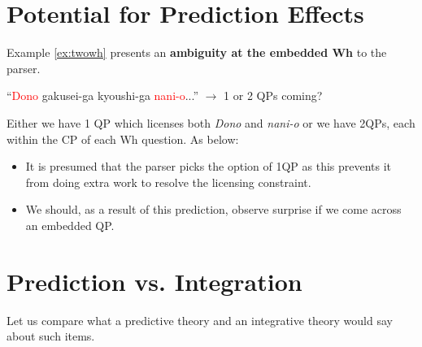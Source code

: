 \documentclass[12pt]{article}
\begin{document}
\section{Potential for Prediction Effects}
Example \ref{ex:twowh} presents an \textbf{ambiguity at the embedded Wh} to the parser.
\begin{center}
``\textcolor{red}{Dono} gakusei-ga kyoushi-ga \textcolor{red}{nani-o}...'' $\rightarrow$ 1 or 2 QPs coming?
\end{center}
Either we have 1 QP which licenses both \textit{Dono} and \textit{nani-o} 
or we have 2QPs, each within the CP of each Wh question. As below: \\

\noindent{}

\begin{itemize}
    \item It is presumed that the parser picks the option of 1QP as this prevents it from doing extra work to resolve
    the licensing constraint.
    \item We should, as a result of this prediction, observe surprise if we come across an embedded QP.
\end{itemize}

\section{Prediction vs. Integration}
Let us compare what a predictive theory and an integrative theory would say about such items.
\end{document}
